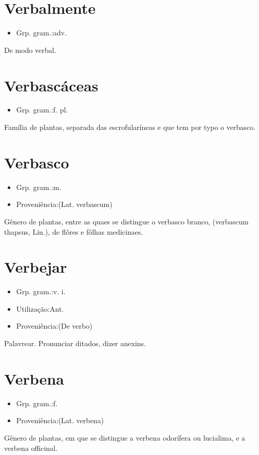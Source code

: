 \documentclass{article}
\begin{document}
\section{Verbalmente}
\begin{itemize}
\item {Grp. gram.:adv.}
\end{itemize}
De modo verbal.
\section{Verbascáceas}
\begin{itemize}
\item {Grp. gram.:f. pl.}
\end{itemize}
Família de plantas, separada das escrofularíneas e que tem por typo o verbasco.
\section{Verbasco}
\begin{itemize}
\item {Grp. gram.:m.}
\end{itemize}
\begin{itemize}
\item {Proveniência:(Lat. \textunderscore verbascum\textunderscore )}
\end{itemize}
Gênero de plantas, entre as quaes se distingue o verbasco branco, (\textunderscore verbascum thapsus\textunderscore , Lin.), de flôres e fôlhas medicinaes.
\section{Verbejar}
\begin{itemize}
\item {Grp. gram.:v. i.}
\end{itemize}
\begin{itemize}
\item {Utilização:Ant.}
\end{itemize}
\begin{itemize}
\item {Proveniência:(De \textunderscore verbo\textunderscore )}
\end{itemize}
Palavrear.
Pronunciar ditados, dizer anexins.
\section{Verbena}
\begin{itemize}
\item {Grp. gram.:f.}
\end{itemize}
\begin{itemize}
\item {Proveniência:(Lat. \textunderscore verbena\textunderscore )}
\end{itemize}
Gênero de plantas, em que se distingue a verbena odorífera ou lucialima, e a verbena officinal.
\end{document}
